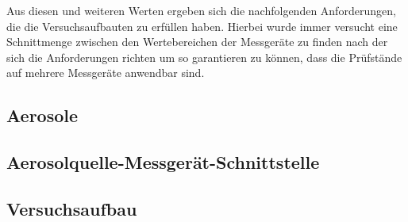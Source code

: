 Aus diesen und weiteren Werten ergeben sich die nachfolgenden Anforderungen, die die Versuchsaufbauten zu erf\"{u}llen haben. Hierbei wurde immer versucht eine Schnittmenge zwischen den Wertebereichen der Messger\"{a}te zu finden nach der sich die Anforderungen richten um so garantieren zu k\"{o}nnen, dass die Pr\"{u}fst\"{a}nde auf mehrere Messger\"{a}te anwendbar sind.   

\subsection{Aerosole}

\subsection{Aerosolquelle-Messger\"{a}t-Schnittstelle}

\subsection{Versuchsaufbau}
